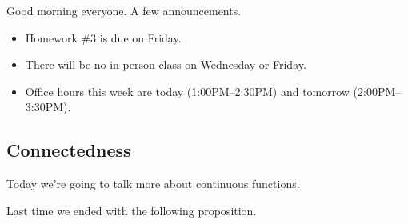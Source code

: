 
Good morning everyone. A few announcements.
\begin{itemize}
	\item Homework \#3 is due on Friday.
	\item There will be no in-person class on Wednesday or Friday.
	\item Office hours this week are today (1:00PM--2:30PM) and tomorrow (2:00PM--3:30PM).
\end{itemize}

\subsection{Connectedness}
Today we're going to talk more about continuous functions.

Last time we ended with the following proposition.
\openconnected*
